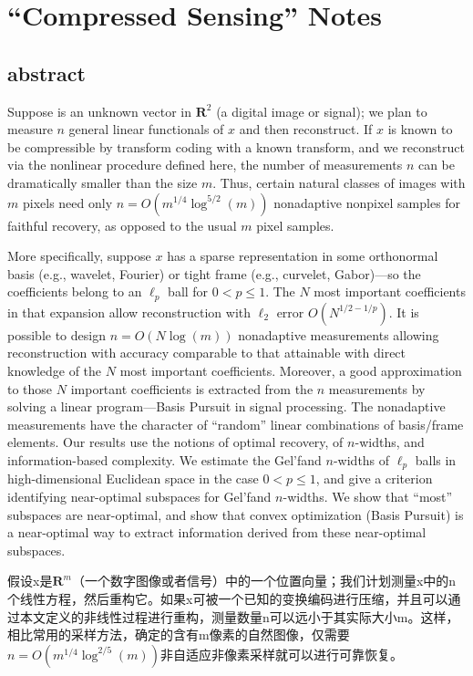 \chapter{``Compressed Sensing'' Notes}
\label{chapter2}
\section{abstract}
Suppose is an unknown vector in $\mathbf{R}^2$ (a digital image or signal); we plan to measure $n$ general linear functionals of $x$ and then reconstruct. If $x$ is known to be compressible by transform coding with a known transform, and we reconstruct via the nonlinear procedure defined here, the number of measurements $n$ can be dramatically smaller than the size $m$. Thus, certain natural classes of images with $m$ pixels need only $n = O(m^{1/4}\log^{5/2}(m))$ nonadaptive nonpixel samples for faithful recovery, as opposed to the usual $m$ pixel samples.

More specifically, suppose $x$ has a sparse representation in some orthonormal basis (e.g., wavelet, Fourier) or tight frame (e.g., curvelet, Gabor)—so the coefficients belong to an $\ell_p$ ball for $0<p \leq 1$. The $N$ most important coefficients in that expansion allow reconstruction with $\ell_2$ error $O(N^{1/2-1/p})$. It is possible to design \textcolor[rgb]{1,0,0}{$n=O(N\log(m))$ nonadaptive measurements} allowing reconstruction with accuracy comparable to that attainable with direct knowledge of the $N$ most important coefficients. Moreover, a good approximation to those $N$ important coefficients is extracted from the $n$ measurements by solving a linear program—Basis Pursuit in signal processing. The nonadaptive measurements have the character of “random” linear combinations of basis/frame elements. Our results use the notions of optimal recovery, of $n$-widths, and information-based complexity. We estimate the Gel'fand $n$-widths of $\ell_p$ balls in high-dimensional Euclidean space in the case $0<p \leq 1$, and give a criterion identifying near-optimal subspaces for Gel'fand $n$-widths. We show that “most” subspaces are near-optimal, and show that convex optimization (Basis Pursuit) is a near-optimal way to extract information derived from these near-optimal subspaces.

    假设x是$\mathbf{R}^m$（一个数字图像或者信号）中的一个位置向量；我们计划测量x中的n个线性方程，然后重构它。如果x可被一个已知的变换编码进行压缩，并且可以通过本文定义的非线性过程进行重构，测量数量n可以远小于其实际大小m。这样，相比常用的采样方法，确定的含有m像素的自然图像，仅需要$n=O(m^{1/4}\log^{2/5}(m))$非自适应非像素采样就可以进行可靠恢复。
	
